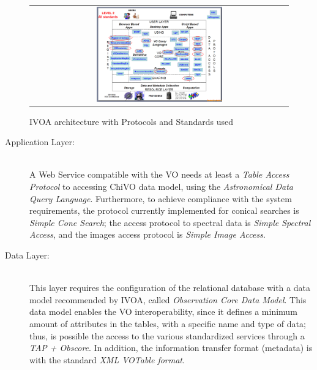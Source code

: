 \documentclass[]{spie}
\begin{document}
\begin{figure}
   \begin{center}
   \begin{tabular}{c}
   \includegraphics[width=0.5\textwidth]{images/arquitectura_2.png}
   \end{tabular}
   \end{center}
   \caption[example]
   {\label{fig:ivoarch} IVOA architecture with Protocols and Standards used}
\end{figure}

\begin{description}
    \item[Application Layer:] \hfill \\
        A Web Service compatible with the VO needs at least a \emph{Table Access Protocol} to accessing ChiVO data model, using the \emph{Astronomical Data Query Language}.  Furthermore, to achieve compliance with the system requirements, the protocol currently implemented for conical searches is \emph{Simple Cone Search}; the access protocol to spectral data is \emph{Simple Spectral Access}, and the images access protocol is \emph{Simple Image Access}. 
    \item[Data Layer:] \hfill \\
        This layer requires the configuration of the relational database with a data model recommended by IVOA, called \emph{Observation Core Data Model}.  This data model enables the VO interoperability, since it defines a minimum amount of attributes in the tables, with a specific name and type of data; thus, is possible the access to the various standardized services through a \emph{TAP + Obscore}.  In addition, the information transfer format (metadata) is with the standard \emph{XML VOTable format}.
\end{description}
\end{document}
